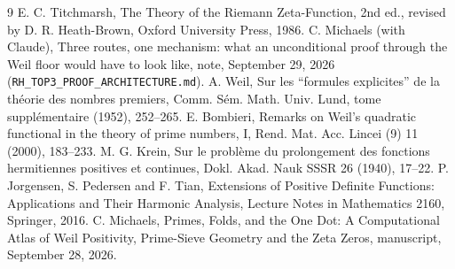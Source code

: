 \documentclass[11pt]{article}
\theoremstyle{definition}
\theoremstyle{remark}
\begin{document}
\begin{thebibliography}{9}
 E. C. Titchmarsh, The Theory of the Riemann Zeta-Function, 2nd ed., revised by D. R. Heath-Brown, Oxford University Press, 1986.
 C. Michaels (with Claude), Three routes, one mechanism: what an unconditional proof through the Weil floor would have to look like, note, September 29, 2026 (\texttt{RH\_TOP3\_PROOF\_ARCHITECTURE.md}).
 A. Weil, Sur les ``formules explicites'' de la th\'eorie des nombres premiers, Comm. S\'em. Math. Univ. Lund, tome suppl\'ementaire (1952), 252--265.
 E. Bombieri, Remarks on Weil's quadratic functional in the theory of prime numbers, I, Rend. Mat. Acc. Lincei (9) 11 (2000), 183--233.
 M. G. Krein, Sur le probl\`eme du prolongement des fonctions hermitiennes positives et continues, Dokl. Akad. Nauk SSSR 26 (1940), 17--22.
 P. Jorgensen, S. Pedersen and F. Tian, Extensions of Positive Definite Functions: Applications and Their Harmonic Analysis, Lecture Notes in Mathematics 2160, Springer, 2016.
 C. Michaels, Primes, Folds, and the One Dot: A Computational Atlas of Weil Positivity, Prime-Sieve Geometry and the Zeta Zeros, manuscript, September 28, 2026.
\end{thebibliography}
\end{document}
